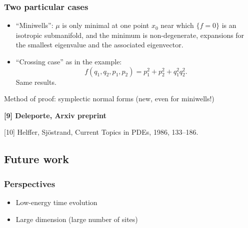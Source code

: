 \documentclass[mathserif]{beamer}
\begin{document}
\begin{frame}
  \frametitle{Two particular cases}
  \begin{itemize}
  \item ``Miniwells'': $\mu$ is only minimal at one point $x_0$ near which $\{f=0\}$ is
    an isotropic submanifold, and the minimum is non-degenerate,
    expansions for the smallest eigenvalue and the associated
    eigenvector.
  \item ``Crossing case'' as in the example:
    \[
      f(q_1,q_2,p_1,p_2)=p_1^2+p_2^2+q_1^2q_2^2.
      \]
    Same results.
  \end{itemize}
  Method of proof: symplectic normal forms (new, even for miniwells!)
  
  \vspace{1em}
  \footnotesize{{\bfseries [9] Deleporte, Arxiv preprint}

    [10] Helffer, Sjöstrand, Current Topics in PDEs, 1986, 133–186.}
\end{frame}

\subsection{Future work}
\begin{frame}
  \frametitle{Perspectives}
    \begin{itemize}
    \item Low-energy time evolution
    \item Large dimension (large number of sites)
    \end{itemize}
\end{frame}
\end{document}
